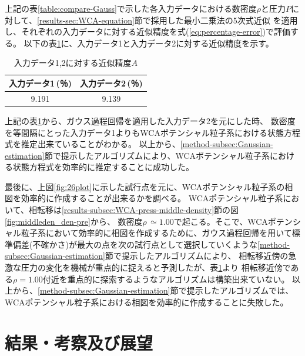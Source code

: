 \documentclass[titlepage]{jsreport}
\begin{document}
{{{\begin{table}[htbp]
\end{table}


上記の表\ref{table:compare-Gauss}で示した各入力データにおける数密度$\rho$と圧力$P$に対して、\ref{results-sec:WCA-equation}節で採用した最小二乗法の5次式近似
を適用し、それぞれの入力データに対する近似精度を式(\ref{eq:percentage-error})で評価する。
以下の表\ref{table:compare-approximation-accuracy}に、入力データ1と入力データ2に対する近似精度を示す。

\begin{table}[htbp]
    \begin{center}
        \caption{入力データ1,2に対する近似精度$A$}
        \label{table:compare-approximation-accuracy}
            \begin{tabular}{c c}
                    入力データ1\,(％) & 入力データ2\,(％) \\ \hline\hline
                    9.191 & 9.139
            \end{tabular}
    \end{center}
    
\end{table}

上記の表\ref{table:compare-approximation-accuracy}から、ガウス過程回帰を適用した入力データ2を元にした時、
数密度を等間隔にとった入力データ1よりもWCAポテンシャル粒子系における状態方程式を推定出来ていることがわかる。
以上から、\ref{method-subsec:Gaussian-estimation}節で提示したアルゴリズムにより、WCAポテンシャル粒子系における状態方程式を効率的に推定することに成功した。

最後に、上図\ref{fig:26plot}に示した試行点を元に、WCAポテンシャル粒子系の相図を効率的に作成することが出来るかを調べる。
WCAポテンシャル粒子系において、相転移は\ref{results-subsec:WCA-press-middle-density}節の図\ref{fig:middleden_den-pre}から、
数密度$\rho\,{\simeq}1.00$で起こる。そこで、WCAポテンシャル粒子系において効率的に相図を作成するために、ガウス過程回帰を用いて標準偏差(不確かさ)が最大の点を次の試行点として選択していくような\ref{method-subsec:Gaussian-estimation}節で提示したアルゴリズムにより、
相転移近傍の急激な圧力の変化を機械が重点的に捉えると予測したが、表\ref{table:compare-approximation-accuracy}より
相転移近傍である$\rho=1.00$付近を重点的に探索するようなアルゴリズムは構築出来ていない。
以上から、\ref{method-subsec:Gaussian-estimation}節で提示したアルゴリズムでは、WCAポテンシャル粒子系における相図を効率的に作成することに失敗した。

\chapter{結果・考察及び展望} \label{chap:summary}

}}}
\end{document}

